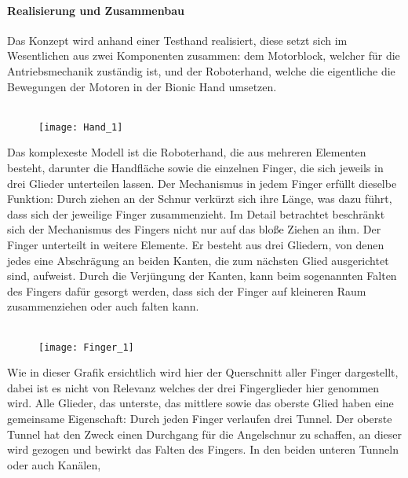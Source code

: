\documentclass[titlepage,12pt,twoside]{article}
\begin{document}
\paragraph{Realisierung und Zusammenbau}
\hfill \break
\hfill \break
Das Konzept wird anhand einer Testhand realisiert, diese setzt sich im Wesentlichen 
aus zwei Komponenten zusammen: dem Motorblock, welcher für die Antriebsmechanik 
zuständig ist, und der Roboterhand, welche die eigentliche die Bewegungen der Motoren 
in der Bionic Hand umsetzen. \\
\\
\begin{figure}[H]
	\begin{center}
		\scalebox{1}
		{\texttt{[image: Hand\_1]}}
	\end{center}
\end{figure}
\hfill \break
Das komplexeste Modell ist die Roboterhand, die aus mehreren Elementen besteht, 
darunter die Handfläche sowie die einzelnen Finger, die sich jeweils in drei Glieder 
unterteilen lassen. Der Mechanismus in jedem Finger erfüllt dieselbe Funktion: Durch 
ziehen an der Schnur verkürzt sich ihre Länge, was dazu führt, dass sich der 
jeweilige Finger zusammenzieht. Im Detail betrachtet beschränkt sich der Mechanismus 
des Fingers nicht nur auf das bloße Ziehen an ihm. Der Finger unterteilt in weitere 
Elemente. Er besteht aus drei Gliedern, von denen jedes eine Abschrägung an beiden 
Kanten, die zum nächsten Glied ausgerichtet sind, aufweist. Durch die Verjüngung der 
Kanten, kann beim sogenannten Falten des Fingers dafür gesorgt werden, dass sich der 
Finger auf kleineren Raum zusammenziehen oder auch falten kann. \\
\\
\begin{figure}[H]
	\begin{center}
		\scalebox{1}
		{\texttt{[image: Finger\_1]}}
	\end{center}
\end{figure}
\hfill \break
Wie in dieser Grafik ersichtlich wird hier der Querschnitt aller Finger dargestellt, 
dabei ist es nicht von Relevanz welches der drei Fingerglieder hier genommen wird. 
Alle Glieder, das unterste, das mittlere sowie das oberste Glied haben eine 
gemeinsame Eigenschaft: Durch jeden Finger verlaufen drei Tunnel. Der oberste Tunnel 
hat den Zweck einen Durchgang für die Angelschnur zu schaffen, an dieser wird gezogen 
und bewirkt das Falten des Fingers. In den beiden unteren Tunneln oder auch Kanälen, 
\end{document}
